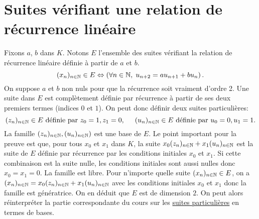 \section{Suites vérifiant une relation de récurrence linéaire}
Fixons $a$, $b$ dans $K$. Notons $E$ l'ensemble des suites vérifiant la relation de récurrence linéaire définie à partir de $a$ et $b$.
\[
  (x_n)_{n\in \mathbb{N}} \in E \Leftrightarrow \left( \forall n \in \mathbb{N}, \; u_{n+2} = au_{n+1} + bu_n\right).
\]
On suppose $a$ et $b$ non nuls pour que la récurrence soit vraiment d'ordre 2. Une suite dans $E$ est complètement définie par récurrence à partir de ses deux premiers termes (indices $0$ et $1$). On peut donc définir deux suites particulières:
\[
  (z_n)_{n\in \mathbb{N}} \in E \text{ définie par } z_0 = 1, z_1 = 0,\hspace{0.5cm} (u_n)_{n\in \mathbb{N}} \in E \text{ définie par } u_0 = 0, u_1 = 1.
\]
La famille $\left (z_n)_{n\in \mathbb{N}}, (u_n)_{n\in \mathbb{N}} \right)$ est une base de $E$.\newline
Le point important pour la preuve est que, pour tous $x_0$ et $x_1$ dans $K$, la suite $x_0 (z_n)_{n\in \mathbb{N}} + x_1 (u_n)_{n\in \mathbb{N}}$ est la suite de $E$ définie par récurrence par les conditions initiales $x_0$ et $x_1$.\newline
Si cette combinaison est la suite nulle, les conditions initiales sont aussi nulles donc $x_0= x_1=0$. La famille est libre.\newline
Pour n'importe quelle suite $(x_n)_{n\in \mathbb{N}} \in E$, on a $(x_n)_{n\in \mathbb{N}} = x_0 (z_n)_{n\in \mathbb{N}} + x_1 (u_n)_{n\in \mathbb{N}}$ avec les conditions initiales $x_0$ et $x_1$ donc la famille est génératrice.\newline
On en déduit que $E$ est de dimension $2$. On peut alors réinterpréter la partie correspondante du cours sur les \href{\baseurl C2069.pdf}{suites particulières} en termes de bases.

